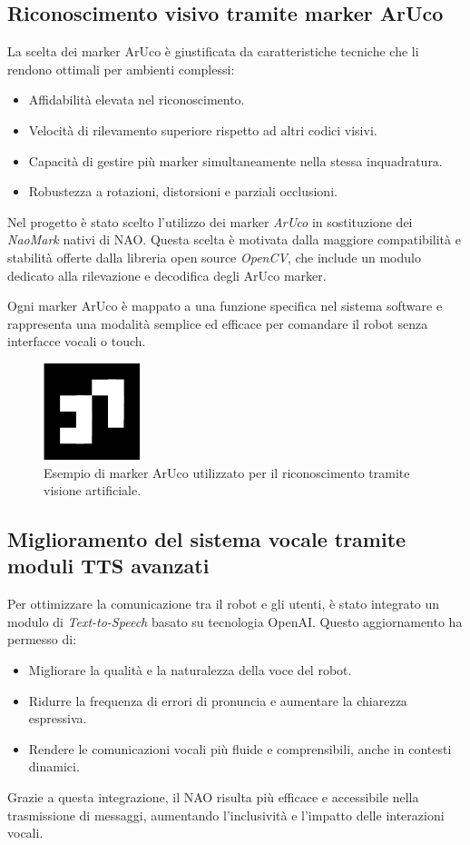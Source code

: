 \documentclass{optica-article}
\begin{document}
\subsection{Riconoscimento visivo tramite marker ArUco}
La scelta dei marker ArUco \`e giustificata da caratteristiche tecniche che li rendono ottimali per ambienti complessi:
\begin{itemize}
    \item Affidabilit\`a elevata nel riconoscimento.
    \item Velocit\`a di rilevamento superiore rispetto ad altri codici visivi.
    \item Capacit\`a di gestire pi\`u marker simultaneamente nella stessa inquadratura.
    \item Robustezza a rotazioni, distorsioni e parziali occlusioni.
\end{itemize}
Nel progetto è stato scelto l’utilizzo dei marker \textit{ArUco} in sostituzione dei \textit{NaoMark} nativi di NAO. Questa scelta è motivata dalla maggiore compatibilità e stabilità offerte dalla libreria open source \textit{OpenCV}, che include un modulo dedicato alla rilevazione e decodifica degli ArUco marker. 

Ogni marker ArUco è mappato a una funzione specifica nel sistema software e rappresenta una modalità semplice ed efficace per comandare il robot senza interfacce vocali o touch.

\begin{figure}[h!]
    \centering
    \includegraphics[width=0.25\textwidth]{figures/aruco.png}
    \caption{Esempio di marker ArUco utilizzato per il riconoscimento tramite visione artificiale.}
    \label{fig:aruco_marker}
\end{figure}

\subsection{Miglioramento del sistema vocale tramite moduli TTS avanzati}

Per ottimizzare la comunicazione tra il robot e gli utenti, è stato integrato un modulo di \textit{Text-to-Speech} basato su tecnologia OpenAI. Questo aggiornamento ha permesso di:
\begin{itemize}
    \item Migliorare la qualità e la naturalezza della voce del robot.
    \item Ridurre la frequenza di errori di pronuncia e aumentare la chiarezza espressiva.
    \item Rendere le comunicazioni vocali più fluide e comprensibili, anche in contesti dinamici.
\end{itemize}
Grazie a questa integrazione, il NAO risulta più efficace e accessibile nella trasmissione di messaggi, aumentando l'inclusività e l’impatto delle interazioni vocali.
\end{document}
